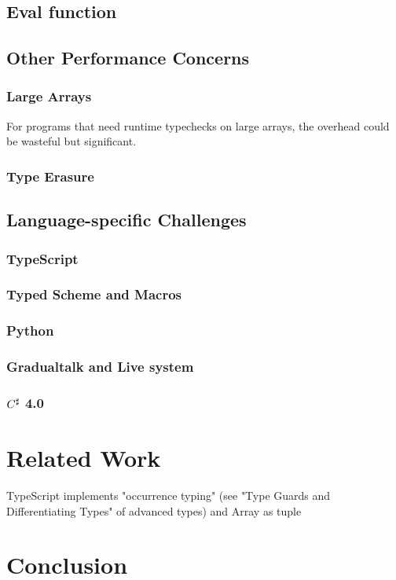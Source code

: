 \section{Eval function}

\section{Other Performance Concerns}

\subsection{Large Arrays}

For programs that need runtime typechecks on large arrays,
the overhead could be wasteful but significant.

\subsection{Type Erasure}

\section{Language-specific Challenges}

\subsection{TypeScript}

\subsection{Typed Scheme and Macros}

\subsection{Python}

\subsection{Gradualtalk and Live system}

\subsection{$C^\sharp$ 4.0}

\renewcommand{\thechapter}{4}
\chapter{Related Work}


TypeScript implements "occurrence typing" (see "Type Guards and Differentiating Types" of advanced types) and Array as tuple 


\renewcommand{\thechapter}{5}
\chapter{Conclusion}